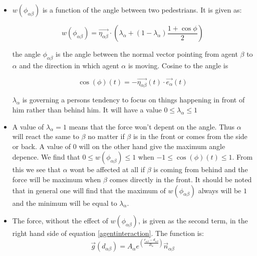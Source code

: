 \begin{itemize}
\item $w\left(\phi_{\alpha \beta}\right)$ is a function of the angle between two pedestrians. It is given as: 

\begin{equation}
    w\left(\phi_{\alpha \beta}\right)=
    \vec{\eta_{\alpha \beta}} \cdot
    \left(
        \lambda_{\alpha} + \left(
            1 - \lambda_{\alpha}
        \right)
		\frac{1+\cos{\phi}}{2}
    \right) 
    \label{angleAB}
\end{equation}

the angle $\phi_{\alpha \beta}$ is the angle between the normal 
vector pointing from agent $\beta$ to $\alpha$ and the direction in which 
agent $\alpha$ is moving. Cosine to the angle is 

\begin{equation}
\cos \left( \phi \right)
	\left( t \right) 
		= 
	- \vec{\eta_{\alpha \beta}}
		\left( t \right) 
	\cdot 
\vec{e_{\alpha}}\left( t \right)
\end{equation}

$\lambda_{\alpha}$ is governing a persons tendency to focus on things happening in front of him 
rather than behind him. It will have a value  $0\leq \lambda_{\alpha}\leq 1$

\item A value of $\lambda_{\alpha}=1$ means that the force won't depent on the angle. Thus $\alpha$ will react the same to $\beta$ no matter if $\beta$ is in the front or comes from the side or back. A value of $0$ will on the other hand give the maximum angle depence. We find that $0\leq w\left(\phi_{\alpha \beta}\right)\leq1$ when $-1 \leq \cos \left( \phi \right) \left( t \right) \leq 1$. From this we see that $\alpha$ wont be affected at all if $\beta$ is coming from behind and the force will be maximum when $\beta$ comes directly in the front. It should be noted that in general one will find that the maximum of $w\left(\phi_{\alpha \beta}\right)$ always will be $1$ and the minimum will be equal to $\lambda_{\alpha}$.   


\item The force, without the effect of $w\left(\phi_{\alpha \beta}\right)$, is given as the second term, in the right hand side of equation \ref{agentinteraction}. The function is:  
\begin{equation}
	\vec{g} 
	\left(
	d_{\alpha \beta}
	\right)
	=
	 A_{\alpha} e^{ \left(\frac{ r_{\alpha \beta} - d_{\alpha \beta}}{B_{\alpha}}\right)}
	\vec{n}_{\alpha \beta}
	        \label{re}	
\end{equation}


\end{itemize}
